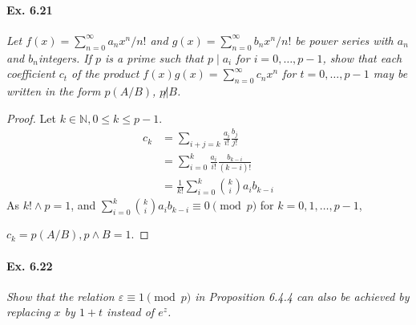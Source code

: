 \documentclass[11pt,a4paper]{article}
\newcommand{\N}{\mathbb{N}}
\begin{document}
\paragraph{Ex. 6.21}

{\it Let $f(x) = \sum_{n=0}^\infty a_n x^n/n!$ and $g(x) =\sum_{n=0}^\infty b_n x^n/n!$ be power series with $a_n$ and $b_n$integers. If $p$ is a prime such that $p\mid a_i$ for $i = 0, \ldots,
p-1$, show that each coefficient $c_t$ of the product $f(x)g(x) = \sum_{n=0}^\infty c_n x^n$ for $t = 0, \ldots, p-1$ may be written in the form $p(A/B)$, $p\not | B$.
}

\begin{proof}
Let $k \in \N, 0 \leq k \leq p-1$.
\begin{align*}
c_k &= \sum_{i+j=k} \frac{a_i}{i!}\frac{b_j}{j!}\\
&= \sum_{i=0}^k \frac{a_i}{i!}\frac{b_{k-i}}{(k-i)!}\\
&=\frac{1}{k!} \sum_{i=0}^k \binom{k}{i} a_i b_{k-i}
\end{align*}
As $k! \wedge p = 1$, and $\sum_{i=0}^k \binom{k}{i} a_i b_{k-i} \equiv 0 \pmod p$ for $k=0,1,\ldots,p-1$,

$c_k = p(A/B) , p \wedge B = 1$.
\end{proof}


\paragraph{Ex. 6.22}

{\it Show that the relation $\varepsilon \equiv 1 \pmod p$ in Proposition
6.4.4 can also be achieved by replacing $x$ by $1+t$ instead of $e^z$.
}
\end{document}
